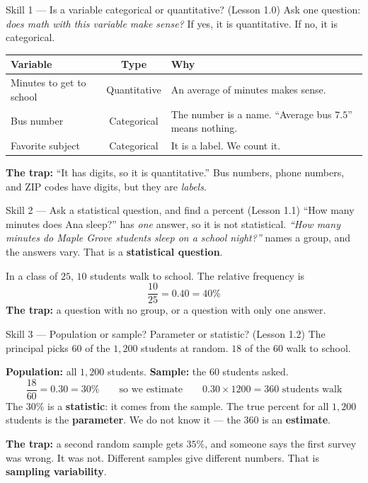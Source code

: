 \documentclass[10pt]{article}
\begin{document}
\vspace{4pt}
\boxguard[14]
\begin{notesbox}{Skill 1 --- Is a variable categorical or quantitative? (Lesson 1.0)}
\small
Ask one question: \emph{does math with this variable make sense?} If yes, it is quantitative.
If no, it is categorical.

\vspace{2pt}
\renewcommand{\arraystretch}{1.2}
\begin{tabularx}{\linewidth}{@{} X c X @{}}
\rowcolor{frost}
\textbf{Variable} & \textbf{Type} & \textbf{Why} \\
\midrule
Minutes to get to school & Quantitative & An average of minutes makes sense. \\
Bus number & Categorical & The number is a name. ``Average bus $7.5$'' means nothing. \\
Favorite subject & Categorical & It is a label. We count it. \\
\end{tabularx}

\vspace{3pt}
\textbf{The trap:} ``It has digits, so it is quantitative.'' Bus numbers, phone numbers, and
ZIP codes have digits, but they are \emph{labels}.
\end{notesbox}

\vspace{3pt}
\boxguard[14]
\begin{notesbox}{Skill 2 --- Ask a statistical question, and find a percent (Lesson 1.1)}
\small
``How many minutes does Ana sleep?'' has \emph{one} answer, so it is not statistical.
\emph{``How many minutes do Maple Grove students sleep on a school night?''} names a group, and
the answers vary. That is a \textbf{statistical question}.

\vspace{2pt}
In a class of $25$, $10$ students walk to school. The relative frequency is
\[ \frac{10}{25} = 0.40 = 40\% \]
\textbf{The trap:} a question with no group, or a question with only one answer.
\end{notesbox}

\vspace{3pt}
\boxguard[8]
\begin{notesbox}{Skill 3 --- Population or sample? Parameter or statistic? (Lesson 1.2)}
\small
The principal picks $60$ of the $1{,}200$ students at random. $18$ of the $60$ walk to school.

\vspace{2pt}
\textbf{Population:} all $1{,}200$ students. \quad \textbf{Sample:} the $60$ students asked.
\[ \frac{18}{60} = 0.30 = 30\% \qquad\text{so we estimate}\qquad 0.30 \times 1200 = 360
   \text{ students walk} \]
The $30\%$ is a \textbf{statistic}: it comes from the sample. The true percent for all
$1{,}200$ students is the \textbf{parameter}. We do not know it --- the $360$ is an
\textbf{estimate}.

\vspace{2pt}
\textbf{The trap:} a second random sample gets $35\%$, and someone says the first survey was
wrong. It was not. Different samples give different numbers. That is \textbf{sampling
variability}.
\end{notesbox}
\end{document}
